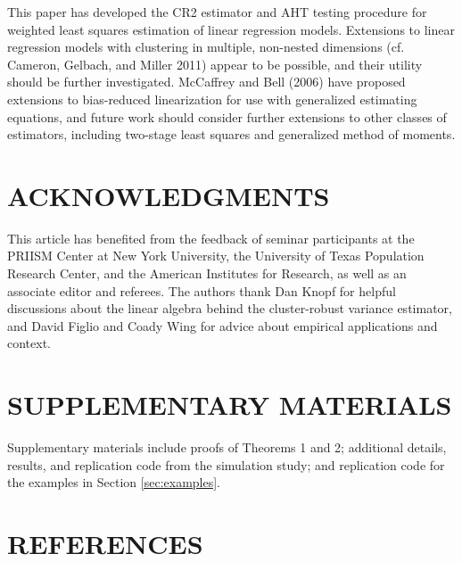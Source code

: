 \documentclass[12pt]{article}
\begin{document}
This paper has developed the CR2 estimator and AHT testing procedure for
weighted least squares estimation of linear regression models.
Extensions to linear regression models with clustering in multiple,
non-nested dimensions (cf. Cameron, Gelbach, and Miller 2011) appear to
be possible, and their utility should be further investigated. McCaffrey
and Bell (2006) have proposed extensions to bias-reduced linearization
for use with generalized estimating equations, and future work should
consider further extensions to other classes of estimators, including
two-stage least squares and generalized method of moments.

\hypertarget{acknowledgments}{%
\section*{ACKNOWLEDGMENTS}\label{acknowledgments}}

This article has benefited from the feedback of seminar participants at
the PRIISM Center at New York University, the University of Texas
Population Research Center, and the American Institutes for Research, as
well as an associate editor and referees. The authors thank Dan Knopf
for helpful discussions about the linear algebra behind the
cluster-robust variance estimator, and David Figlio and Coady Wing for
advice about empirical applications and context.

\hypertarget{supplementary-materials}{%
\section*{SUPPLEMENTARY MATERIALS}\label{supplementary-materials}}

Supplementary materials include proofs of Theorems 1 and 2; additional
details, results, and replication code from the simulation study; and
replication code for the examples in Section \ref{sec:examples}.

\hypertarget{references}{%
\section*{REFERENCES}\label{references}}
\end{document}
